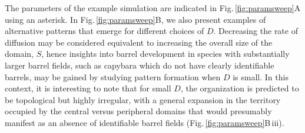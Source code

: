 \documentclass[9pt,lineno]{elife}
\newcommand{\MPthreePar}[1]{\textcolor{colmpthreepar}{#1}}
\begin{document}
\MPthreePar{The parameters of the example simulation are indicated in
  Fig.\,\ref{fig:paramsweep}A using an asterisk. In
  Fig.\,\ref{fig:paramsweep}B, we also present examples of alternative
  patterns that emerge for different choices of $D$. Decreasing the rate of
  diffusion may be considered equivalent to increasing the overall size of the
  domain, $S$, hence insights into barrel development in species with
  substantially larger barrel fields, such as capybara which do not have
  clearly identifiable barrels, may be gained by studying pattern formation
  when $D$ is small. In this context, it is interesting to note that for small
  $D$, the organization is predicted to be topological but highly irregular,
  with a general expansion in the territory occupied by the central versus
  peripheral domains that would presumably manifest as an absence of
  identifiable barrel fields (Fig.\,\ref{fig:paramsweep}B\,iii).}
\end{document}
